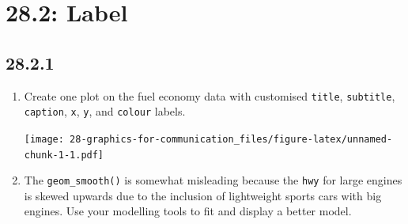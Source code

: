 \documentclass[]{book}
\newenvironment{Shaded}{\begin{snugshade}}{\end{snugshade}}
\newcommand{\DataTypeTok}[1]{\textcolor[rgb]{0.13,0.29,0.53}{#1}}
\newcommand{\KeywordTok}[1]{\textcolor[rgb]{0.13,0.29,0.53}{\textbf{#1}}}
\newcommand{\NormalTok}[1]{#1}
\newcommand{\OperatorTok}[1]{\textcolor[rgb]{0.81,0.36,0.00}{\textbf{#1}}}
\newcommand{\StringTok}[1]{\textcolor[rgb]{0.31,0.60,0.02}{#1}}
\theoremstyle{definition}
\theoremstyle{definition}
\theoremstyle{definition}
\theoremstyle{remark}
\begin{document}
\hypertarget{label}{%
\section{28.2: Label}\label{label}}

\hypertarget{section-95}{%
\subsection{28.2.1}\label{section-95}}

\begin{enumerate}
\def\labelenumi{\arabic{enumi}.}
\item
  Create one plot on the fuel economy data with customised
  \texttt{title}, \texttt{subtitle}, \texttt{caption}, \texttt{x},
  \texttt{y}, and \texttt{colour} labels.

\begin{Shaded}
\end{Shaded}

  \texttt{[image: 28-graphics-for-communication\_files/figure-latex/unnamed-chunk-1-1.pdf]}
\item
  The \texttt{geom\_smooth()} is somewhat misleading because the
  \texttt{hwy} for large engines is skewed upwards due to the inclusion
  of lightweight sports cars with big engines. Use your modelling tools
  to fit and display a better model.


\end{enumerate}
\end{document}
